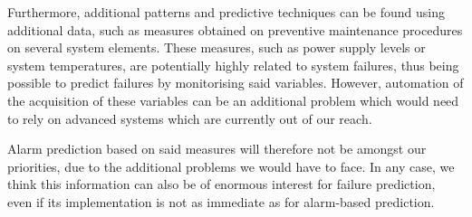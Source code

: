 Furthermore, additional patterns and predictive techniques can be found using additional data, such as measures obtained on preventive maintenance procedures on several system elements. These measures, such as power supply levels or system temperatures, are potentially highly related to system failures, thus being possible to predict failures by monitorising said variables. However, automation of the acquisition of these variables can be an additional problem which would need to rely on advanced systems which are currently out of our reach. 

Alarm prediction based on said measures will therefore not be amongst our priorities, due to the additional problems we would have to face. In any case, we think this information can also be of enormous interest for failure prediction, even if its implementation is not as immediate as for alarm-based prediction.